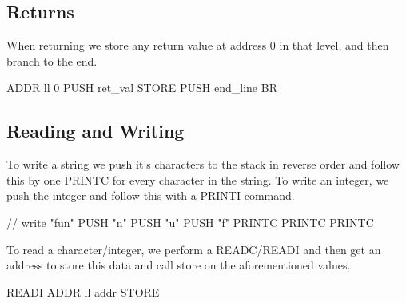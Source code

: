 \subsection{Returns}

When returning we store any return value at address 0 in that level, and then
branch to the end.

\begin{code}[IfStatement]
ADDR ll 0
PUSH ret_val
STORE
PUSH end_line
BR
\end{code}

\subsection{Reading and Writing}

To write a string we push it's characters to the stack in reverse order and follow
this by one PRINTC for every character in the string. To write an integer, we push
the integer and follow this with a PRINTI command.

\begin{code}[Writing]
// write "fun"
PUSH "n"
PUSH "u"
PUSH "f"
PRINTC
PRINTC
PRINTC
\end{code}

To read a character/integer, we perform a READC/READI and then get an address to 
store this data and call store on the aforementioned values.

\begin{code}[Writing]
READI
ADDR ll addr
STORE
\end{code}
